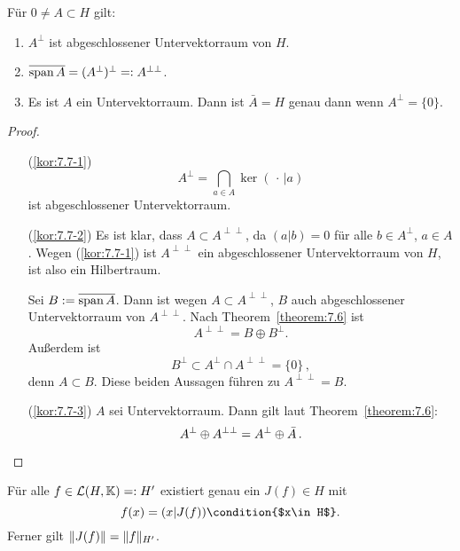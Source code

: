 \begin{kor}
  \label{kor:7.7} Für $0\neq A\subset H$ gilt:
  \begin{enumerate}[\rm(i)]
  \item \label{kor:7.7-1} $A^\perp$ ist abgeschlossener Untervektorraum von $H$.
  \item \label{kor:7.7-2} $\overline{\operatorname{span} A}=(A^\perp)^\perp=:A^{\perp\perp}$.
  \item \label{kor:7.7-3} Es ist $A$ ein Untervektorraum. Dann ist $\bar A=H$ genau dann wenn $A^\perp=\{0\}$.
  \end{enumerate}
\end{kor}

\begin{proof}
  \begin{enumerate}
  \item[(\ref{kor:7.7-1})] \[ A^\perp=\bigcap_{a\in A}\ker(\, \cdot \, \vert a) \]
    ist abgeschlossener Untervektorraum.
  \item[(\ref{kor:7.7-2})] Es ist klar, dass $A\subset A^{\perp\perp}$, da $(a\vert b)=0$ für alle $b\in A^\perp$, $a\in A$. Wegen (\ref{kor:7.7-1}) ist $A^{\perp\perp}$ ein abgeschlossener Untervektorraum von $H$, ist also ein Hilbertraum.

    Sei $B:=\overline{\operatorname{span} A}$. Dann ist wegen $A\subset A^{\perp\perp}$, $B$ auch abgeschlossener Untervektorraum von $A^{\perp\perp}$. Nach Theorem~\ref{theorem:7.6} ist
    \[ A^{\perp\perp}=B\oplus B^\perp. \]
    Außerdem ist
    \[ B^\perp\subset A^\perp\cap A^{\perp\perp}=\{0\}\, , \]
    denn $A\subset B$. Diese beiden Aussagen führen zu $A^{\perp\perp}=B$.
  \item[(\ref{kor:7.7-3})] $A$ sei Untervektorraum. Dann gilt laut Theorem~\ref{theorem:7.6}:
    \[ A^\perp\oplus A^{\perp\perp}=A^\perp\oplus \bar A\, . \qedhere \]
  \end{enumerate}
\end{proof}


\begin{theorem}[Riesz]
  \label{theorem:7.8} 
  Für alle $f\in\mathcal{L}(H,\mathbb{K})=:H'$ existiert genau ein $J(f)\in H$ mit
  \begin{dmath*}
    f(x)=(x\vert J(f))\condition{$x\in H$}.
  \end{dmath*}
  Ferner gilt $\lVert J(f)\rVert=\lVert f\rVert_{H'}$.  
\end{theorem}

